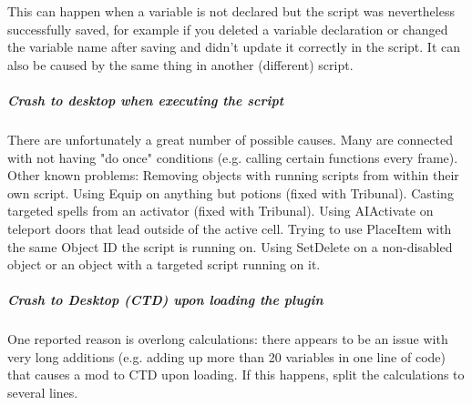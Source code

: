 This can happen when a variable is not declared but the script was
nevertheless successfully saved, for example if you deleted a variable
declaration or changed the variable name after saving and didn't update
it correctly in the script. It can also be caused by the same thing in
another (different) script.

\hypertarget{crash-to-desktop-when-executing-the-script}{%
\subparagraph{Crash to desktop when executing the
script}\label{crash-to-desktop-when-executing-the-script}}

There are unfortunately a great number of possible causes. Many are
connected with not having "do once" conditions (e.g. calling certain
functions every frame). Other known problems: Removing objects with
running scripts from within their own script. Using Equip on anything
but potions (fixed with Tribunal). Casting targeted spells from an
activator (fixed with Tribunal). Using AIActivate on teleport doors that
lead outside of the active cell. Trying to use PlaceItem with the same
Object ID the script is running on. Using SetDelete on a non-disabled
object or an object with a targeted script running on it.

\hypertarget{crash-to-desktop-ctd-upon-loading-the-plugin}{%
\subparagraph{\texorpdfstring{Crash to Desktop (CTD) upon loading the
plugin
}{Crash to Desktop (CTD) upon loading the plugin }}\label{crash-to-desktop-ctd-upon-loading-the-plugin}}

One reported reason is overlong calculations: there appears to be an
issue with very long additions (e.g. adding up more than 20 variables in
one line of code) that causes a mod to CTD upon loading. If this
happens, split the calculations to several lines.
